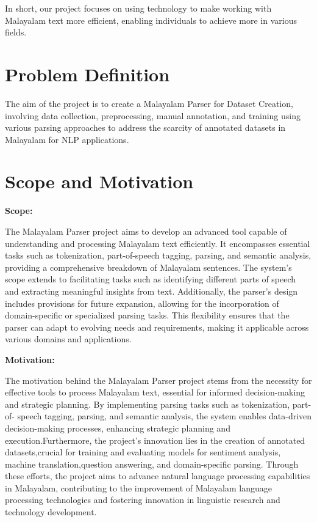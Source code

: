 \documentclass[12pt,a4paper,titlepage]{report}
\begin{document}
	In short, our project focuses on using technology to make working with Malayalam text more efficient, enabling individuals to achieve more in various fields.
	
	
	
	
	
	\section{Problem Definition}
	
	The aim of the project is to create a Malayalam Parser for Dataset Creation, involving data collection, preprocessing, manual annotation, and training using various parsing approaches to address the scarcity of annotated datasets in Malayalam for NLP applications.
	
	
	\section{Scope and Motivation}
	
		\textbf{Scope:}
		
		The Malayalam Parser project aims to develop an advanced tool capable of
		understanding and processing Malayalam text efficiently. It encompasses essential
		tasks such as tokenization, part-of-speech tagging, parsing, and semantic analysis,
		providing a comprehensive breakdown of Malayalam sentences. The system's scope
		extends to facilitating tasks such as identifying different parts of speech and
		extracting meaningful insights from text. Additionally, the parser's design includes
		provisions for future expansion, allowing for the incorporation of domain-specific or specialized parsing tasks. This flexibility ensures that the parser can adapt to
		evolving needs and requirements, making it applicable across various domains and
		applications.
		
		\textbf{Motivation:}
		
	    The motivation behind the Malayalam Parser project stems from the necessity for effective tools to process Malayalam text, essential for informed decision-making and strategic planning. By implementing parsing tasks such as tokenization, part-of-
		speech tagging, parsing, and semantic analysis, the system enables data-driven decision-making processes, enhancing strategic planning and execution.Furthermore, the project's innovation lies in the creation of annotated datasets,crucial for training and evaluating models for sentiment analysis, machine translation,question answering, and domain-specific parsing. Through these efforts, the project aims to advance natural language processing capabilities in Malayalam, contributing to the improvement of Malayalam language processing technologies and fostering innovation in linguistic research and technology development.
	
\end{document}
